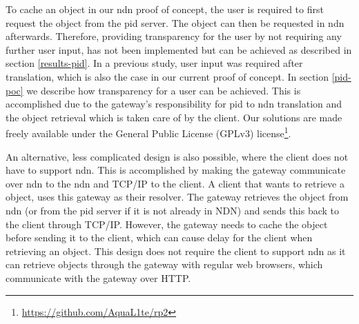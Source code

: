 To cache an object in our \gls{ndn} proof of concept, the user is required to first request the object from the \gls{pid} server. The object can then be requested in \gls{ndn} afterwards. Therefore, providing transparency for the user by not requiring any further user input, has not been implemented but can be achieved as described in section \ref{results-pid}. In a previous study, user input was required after translation, which is also the case in our current proof of concept. In section \ref{pid-poc} we describe how transparency for a user can be achieved. This is accomplished due to the gateway’s responsibility for \gls{pid} to \gls{ndn} translation and the object retrieval which is taken care of by the client. Our solutions are made freely available under the General Public License (GPLv3) license\footnote{\url{https://github.com/AquaL1te/rp2}}.

An alternative, less complicated design is also possible, where the client does not have to support \gls{ndn}. This is accomplished by making the gateway communicate over \gls{ndn} to the \gls{ndn} and TCP/IP to the client. A client that wants to retrieve a object, uses this gateway as their resolver. The gateway retrieves the object from \gls{ndn} (or from the \gls{pid} server if it is not already in NDN) and sends this back to the client through TCP/IP. However, the gateway needs to cache the object before sending it to the client, which can cause delay for the client when retrieving an object. This design does not require the client to support \gls{ndn} as it can retrieve objects through the gateway with regular web browsers, which communicate with the gateway over HTTP. 

















